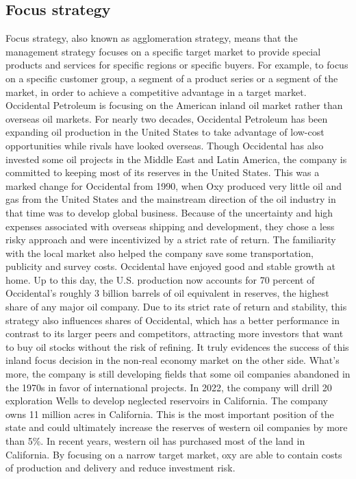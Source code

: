 \documentclass[
	a4paper, %
	12pt,%
]{CSSullivanBusinessReport}
\begin{document}
\begin{fullwidth}
\subsection{Focus strategy}
Focus strategy, also known as agglomeration strategy, means that the management strategy focuses on a specific target market to provide special products and services for specific regions or specific buyers. For example, to focus on a specific customer group, a segment of a product series or a segment of the market, in order to achieve a competitive advantage in a target market. Occidental Petroleum is focusing on the American inland oil market rather than overseas oil markets.
For nearly two decades, Occidental Petroleum has been expanding oil production in the United States to take advantage of low-cost opportunities while rivals have looked overseas. Though Occidental has also invested some oil projects in the Middle East and Latin America, the company is committed to keeping most of its reserves in the United States. This was a marked change for Occidental from 1990, when Oxy produced very little oil and gas from the United States and the mainstream direction of the oil industry in that time was to develop global business. Because of the uncertainty and high expenses associated with overseas shipping and development, they chose a less risky approach and were incentivized by a strict rate of return. The familiarity with the local market also helped the company save some transportation, publicity and survey costs. Occidental have enjoyed good and stable growth at home. Up to this day, the U.S. production now accounts for 70 percent of Occidental's roughly 3 billion barrels of oil equivalent in reserves, the highest share of any major oil company. Due to its strict rate of return and stability, this strategy also influences shares of Occidental, which has a better performance in contrast to its larger peers and competitors, attracting more investors that want to buy oil stocks without the risk of refining. It truly evidences the success of this inland focus decision in the non-real economy market on the other side. What’s more, the company is still developing fields that some oil companies abandoned in the 1970s in favor of international projects. In 2022, the company will drill 20 exploration Wells to develop neglected reservoirs in California. The company owns 11 million acres in California. This is the most important position of the state and could ultimately increase the reserves of western oil companies by more than 5\%. In recent years, western oil has purchased most of the land in California. By focusing on a narrow target market, oxy are able to contain costs of production and delivery and reduce investment risk. \par

\end{fullwidth}
\end{document}
